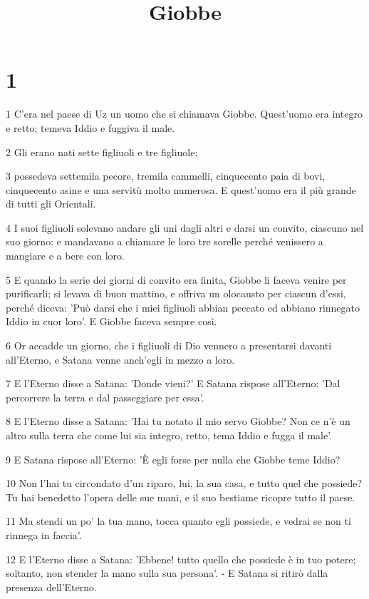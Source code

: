 

\title{Giobbe}


\chapter{1}

\par 1 C'era nel paese di Uz un uomo che si chiamava Giobbe. Quest'uomo era integro e retto; temeva Iddio e fuggiva il male.
\par 2 Gli erano nati sette figliuoli e tre figliuole;
\par 3 possedeva settemila pecore, tremila cammelli, cinquecento paia di bovi, cinquecento asine e una servitù molto numerosa. E quest'uomo era il più grande di tutti gli Orientali.
\par 4 I suoi figliuoli solevano andare gli uni dagli altri e darsi un convito, ciascuno nel suo giorno: e mandavano a chiamare le loro tre sorelle perché venissero a mangiare e a bere con loro.
\par 5 E quando la serie dei giorni di convito era finita, Giobbe li faceva venire per purificarli; si levava di buon mattino, e offriva un olocausto per ciascun d'essi, perché diceva: 'Può darsi che i miei figliuoli abbian peccato ed abbiano rinnegato Iddio in cuor loro'. E Giobbe faceva sempre così.
\par 6 Or accadde un giorno, che i figliuoli di Dio vennero a presentarsi davanti all'Eterno, e Satana venne anch'egli in mezzo a loro.
\par 7 E l'Eterno disse a Satana: 'Donde vieni?' E Satana rispose all'Eterno: 'Dal percorrere la terra e dal passeggiare per essa'.
\par 8 E l'Eterno disse a Satana: 'Hai tu notato il mio servo Giobbe? Non ce n'è un altro sulla terra che come lui sia integro, retto, tema Iddio e fugga il male'.
\par 9 E Satana rispose all'Eterno: 'È egli forse per nulla che Giobbe teme Iddio?
\par 10 Non l'hai tu circondato d'un riparo, lui, la sua casa, e tutto quel che possiede? Tu hai benedetto l'opera delle sue mani, e il suo bestiame ricopre tutto il paese.
\par 11 Ma stendi un po' la tua mano, tocca quanto egli possiede, e vedrai se non ti rinnega in faccia'.
\par 12 E l'Eterno disse a Satana: 'Ebbene! tutto quello che possiede è in tuo potere; soltanto, non stender la mano sulla sua persona'. - E Satana si ritirò dalla presenza dell'Eterno.
